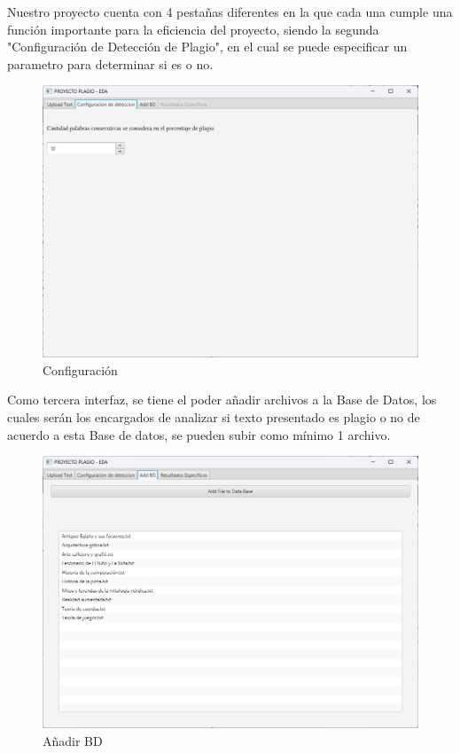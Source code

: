\documentclass[a4paper]{article}
\begin{document}
\begin{multicols}{2}
Nuestro proyecto cuenta con 4 pestañas diferentes en la que cada una cumple una función importante para la eficiencia del proyecto, siendo la segunda "Configuración de Detección de Plagio", en el cual se puede especificar un parametro para determinar si es o no.

\begin{figure}[H]
    \centering
    \includegraphics[width=0.9\linewidth]{img/Conf.png}
    \caption{Configuración}
    \label{fig:enter-label}
\end{figure}

Como tercera interfaz, se tiene el poder añadir archivos a la Base de Datos, los cuales serán los encargados de analizar si texto presentado es plagio o no de acuerdo a esta Base de datos, se pueden subir como mínimo 1 archivo.

\begin{figure}[H]
    \centering
    \includegraphics[width=0.9\linewidth]{img/Db.png}
    \caption{Añadir BD}
    \label{fig:enter-label}
\end{figure}


\end{multicols}
\end{document}

